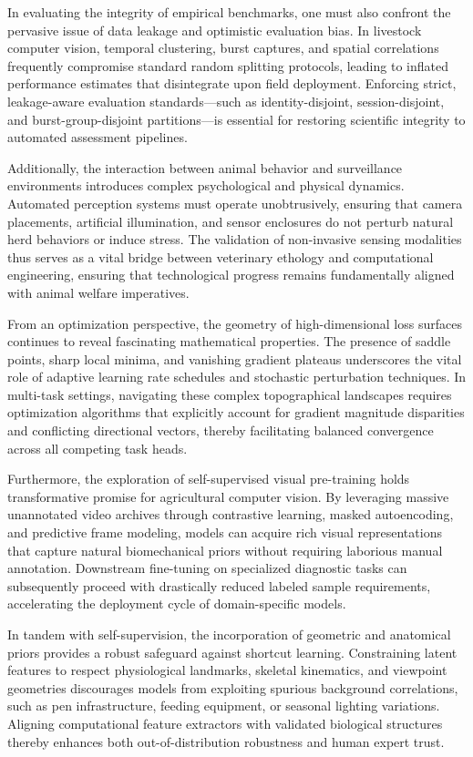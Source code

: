\documentclass[Times,12pt,oneside,openany,print,index]{report}
\begin{document}
In evaluating the integrity of empirical benchmarks, one must also confront the pervasive issue of data leakage and optimistic evaluation bias. In livestock computer vision, temporal clustering, burst captures, and spatial correlations frequently compromise standard random splitting protocols, leading to inflated performance estimates that disintegrate upon field deployment. Enforcing strict, leakage-aware evaluation standards—such as identity-disjoint, session-disjoint, and burst-group-disjoint partitions—is essential for restoring scientific integrity to automated assessment pipelines.

Additionally, the interaction between animal behavior and surveillance environments introduces complex psychological and physical dynamics. Automated perception systems must operate unobtrusively, ensuring that camera placements, artificial illumination, and sensor enclosures do not perturb natural herd behaviors or induce stress. The validation of non-invasive sensing modalities thus serves as a vital bridge between veterinary ethology and computational engineering, ensuring that technological progress remains fundamentally aligned with animal welfare imperatives.

From an optimization perspective, the geometry of high-dimensional loss surfaces continues to reveal fascinating mathematical properties. The presence of saddle points, sharp local minima, and vanishing gradient plateaus underscores the vital role of adaptive learning rate schedules and stochastic perturbation techniques. In multi-task settings, navigating these complex topographical landscapes requires optimization algorithms that explicitly account for gradient magnitude disparities and conflicting directional vectors, thereby facilitating balanced convergence across all competing task heads.

Furthermore, the exploration of self-supervised visual pre-training holds transformative promise for agricultural computer vision. By leveraging massive unannotated video archives through contrastive learning, masked autoencoding, and predictive frame modeling, models can acquire rich visual representations that capture natural biomechanical priors without requiring laborious manual annotation. Downstream fine-tuning on specialized diagnostic tasks can subsequently proceed with drastically reduced labeled sample requirements, accelerating the deployment cycle of domain-specific models.

In tandem with self-supervision, the incorporation of geometric and anatomical priors provides a robust safeguard against shortcut learning. Constraining latent features to respect physiological landmarks, skeletal kinematics, and viewpoint geometries discourages models from exploiting spurious background correlations, such as pen infrastructure, feeding equipment, or seasonal lighting variations. Aligning computational feature extractors with validated biological structures thereby enhances both out-of-distribution robustness and human expert trust.
\end{document}
